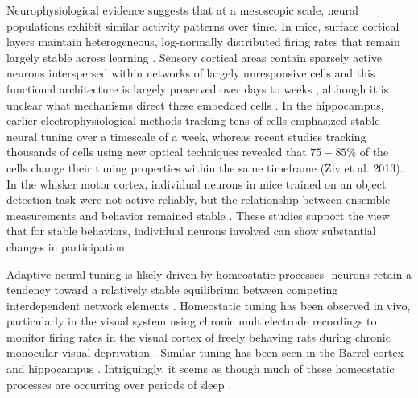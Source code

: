 Neurophysiological evidence suggests that at a mesoscopic scale, neural populations exhibit similar activity patterns over time. In mice, surface cortical layers maintain heterogeneous, log-normally distributed firing rates that remain largely stable across learning \cite{Barth2012-bu}. Sensory cortical areas contain sparsely active neurons interspersed within networks of largely unresponsive cells \cite{Hromadka2008-uv} \cite{Lefort2009-ne}  \cite{Yassin2010-if} and this functional architecture is largely preserved over days to weeks \cite{Margolis2012-pt}, although it is unclear what mechanisms direct these embedded cells \cite{Hromadka2008-uv}. In the hippocampus, earlier electrophysiological methods tracking tens of cells emphasized stable neural tuning over a timescale of a week, whereas recent studies tracking thousands of cells using new optical techniques revealed that $75-85\%$ of the cells change their tuning properties within the same timeframe (Ziv et al. 2013). In the whisker motor cortex, individual neurons in mice trained on an object detection task were not active reliably, but the relationship between ensemble measurements and behavior remained stable \cite{Huber2012-hf}. These studies support the view that for stable behaviors, individual neurons involved can show substantial changes in participation.
 
Adaptive neural tuning is likely driven by homeostatic processes- neurons retain a tendency toward a relatively stable equilibrium between competing interdependent network elements \cite{Turrigiano2008-hq} . Homeostatic tuning has been observed in vivo, particularly in the visual system using chronic multielectrode recordings to monitor firing rates in the visual cortex of freely behaving rats during chronic monocular visual deprivation \cite{Hengen2013-js} \cite{Mrsic-Flogel2007-ed}. Similar tuning has been seen in the Barrel cortex \cite{Holtmaat2009-ie} and hippocampus  \cite{Hirase2001-ow} \cite{Goold2010-fb}. Intriguingly, it seems as though much of these homeostatic processes are occurring over periods of sleep \cite{Hengen2013-js} \cite{Mrsic-Flogel2007-ed} \cite{Hengen2016-nw}.
 
